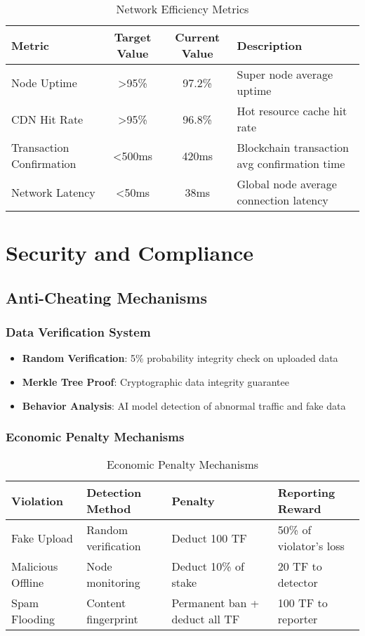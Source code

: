 \documentclass[12pt,a4paper]{article}
\begin{document}
\begin{table}[htbp]
\centering
\begin{tabular}{|l|c|c|l|}
\hline
\textbf{Metric} & \textbf{Target Value} & \textbf{Current Value} & \textbf{Description} \\
\hline
Node Uptime & >95\% & 97.2\% & Super node average uptime \\
\hline
CDN Hit Rate & >95\% & 96.8\% & Hot resource cache hit rate \\
\hline
Transaction Confirmation & <500ms & 420ms & Blockchain transaction avg confirmation time \\
\hline
Network Latency & <50ms & 38ms & Global node average connection latency \\
\hline
\end{tabular}
\caption{Network Efficiency Metrics}
\end{table}

\section{Security and Compliance}

\subsection{Anti-Cheating Mechanisms}

\subsubsection{Data Verification System}
\begin{itemize}
    \item \textbf{Random Verification}: 5\% probability integrity check on uploaded data
    \item \textbf{Merkle Tree Proof}: Cryptographic data integrity guarantee
    \item \textbf{Behavior Analysis}: AI model detection of abnormal traffic and fake data
\end{itemize}

\subsubsection{Economic Penalty Mechanisms}

\begin{table}[htbp]
\centering
\begin{tabular}{|l|l|l|l|}
\hline
\textbf{Violation} & \textbf{Detection Method} & \textbf{Penalty} & \textbf{Reporting Reward} \\
\hline
Fake Upload & Random verification & Deduct 100 TF & 50\% of violator's loss \\
\hline
Malicious Offline & Node monitoring & Deduct 10\% of stake & 20 TF to detector \\
\hline
Spam Flooding & Content fingerprint & Permanent ban + deduct all TF & 100 TF to reporter \\
\hline
\end{tabular}
\caption{Economic Penalty Mechanisms}
\end{table}
\end{document}
